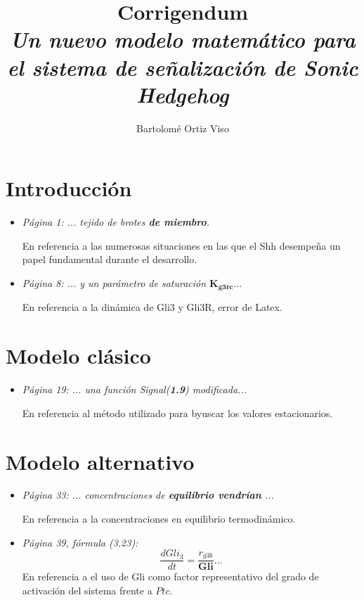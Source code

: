 \documentclass[a4paper,11pt]{article}
\title{\textbf{Corrigendum} \\ \large{\textit{ Un nuevo modelo matemático para el sistema de señalización de Sonic Hedgehog}}}
\author{Bartolomé Ortiz Viso }
\begin{document}
\maketitle

\section{Introducción}
\begin{itemize}
	\item \textit{Página 1:} \textit{... tejido de brotes \textbf{de miembro}.} 
	
	En referencia a las numerosas situaciones en las que el Shh desempeña un papel fundamental durante el desarrollo.
	\item \textit{Página 8:} \textit{... y un parámetro de saturación $\textbf{K}_{\textbf{g3rc}}$}...
	
	En referencia a la dinámica de Gli3 y Gli3R, error de Latex. 
\end{itemize}
\section{Modelo clásico}
\begin{itemize}
	\item \textit{Página 19:} \textit{... una función \textit{Signal}(\textbf{1.9}) modificada...} 
	
	En referencia al método utilizado para byuscar los valores estacionarios.
\end{itemize}
\section{Modelo alternativo}
	\begin{itemize}
			\item \textit{Página 33:} \textit{... concentraciones de \textbf{equilibrio vendrían} ...}
			
			En referencia a la concentraciones en equilibrio termodinámico. 
			
	\item \textit{Página 39, fórmula (3.23):} $$\frac{dGli_3}{dt}=\frac{r_{g3b}}{\textbf{Gli}}\dots$$ En referencia a el uso de Gli como factor representativo del grado de activación del sistema frente a $Ptc$.
	\end{itemize}
\end{document}
